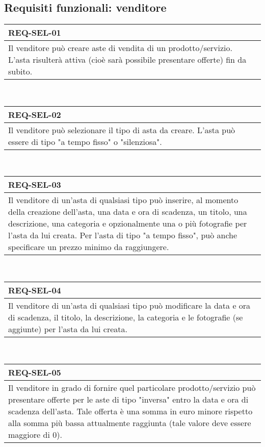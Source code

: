         \subsection{Requisiti funzionali: venditore}
        \begin{tabular}{|p{}|}
            \hline
            \multicolumn{1}{|l|}{\cellcolor{head}\textbf{REQ-SEL-01}} \\
            \hline
            Il venditore può creare aste di vendita di un prodotto/servizio. L'asta risulterà attiva (cioè sarà possibile presentare offerte) fin da subito. \\
            \hline
        \end{tabular} \smallskip \\
        \begin{tabular}{|p{}|}
            \hline
            \multicolumn{1}{|l|}{\cellcolor{head}\textbf{REQ-SEL-02}} \\
            \hline
            Il venditore può selezionare il tipo di asta da creare. L'asta può essere di tipo "a tempo fisso" o "silenziosa". \\
            \hline
        \end{tabular} \smallskip \\
        \begin{tabular}{|p{}|}
            \hline
            \multicolumn{1}{|l|}{\cellcolor{head}\textbf{REQ-SEL-03}} \\
            \hline
            Il venditore di un'asta di qualsiasi tipo può inserire, al momento della creazione dell'asta, una data e ora di scadenza, un titolo, una descrizione, una categoria e opzionalmente una o più fotografie per l'asta da lui creata. Per l'asta di tipo "a tempo fisso", può anche specificare un prezzo minimo da raggiungere. \\
            \hline
        \end{tabular} \smallskip \\
        \begin{tabular}{|p{}|}
            \hline
            \multicolumn{1}{|l|}{\cellcolor{head}\textbf{REQ-SEL-04}} \\
            \hline
            Il venditore di un'asta di qualsiasi tipo può modificare la data e ora di scadenza, il titolo, la descrizione, la categoria e le fotografie (se aggiunte) per l'asta da lui creata. \\
            \hline
        \end{tabular} \smallskip \\
        \begin{tabular}{|p{}|}
            \hline
            \multicolumn{1}{|l|}{\cellcolor{head}\textbf{REQ-SEL-05}} \\
            \hline
            Il venditore in grado di fornire quel particolare prodotto/servizio può presentare offerte per le aste di tipo "inversa" entro la data e ora di scadenza dell'asta. Tale offerta è una somma in euro minore rispetto alla somma più bassa attualmente raggiunta (tale valore deve essere maggiore di 0). \\
            \hline
        \end{tabular} \smallskip \\
